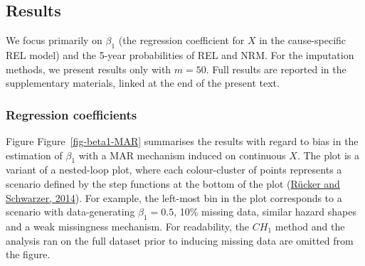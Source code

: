 \documentclass[
  letterpaper,
  DIV=11,
  numbers=noendperiod]{scrreprt}
\begin{document}
\hypertarget{results-1}{%
\subsection{Results}\label{results-1}}

We focus primarily on \(\beta_1\) (the regression coefficient for \(X\)
in the cause-specific REL model) and the 5-year probabilities of REL and
NRM. For the imputation methods, we present results only with
\(m = 50\). Full results are reported in the supplementary materials,
linked at the end of the present text.

\hypertarget{regression-coefficients-1}{%
\subsubsection{Regression
coefficients}\label{regression-coefficients-1}}

Figure Figure~\ref{fig-beta1-MAR} summarises the results with regard to
bias in the estimation of \(\beta_1\) with a MAR mechanism induced on
continuous \(X\). The plot is a variant of a nested-loop plot, where
each colour-cluster of points represents a scenario defined by the step
functions at the bottom of the plot
(\protect\hyperlink{ref-ruckerPresentingSimulationResults2014}{Rücker
and Schwarzer, 2014}). For example, the left-most bin in the plot
corresponds to a scenario with data-generating \(\beta_1 = 0.5\), 10\%
missing data, similar hazard shapes and a weak missingness mechanism.
For readability, the \(CH_{1}\) method and the analysis ran on the full
dataset prior to inducing missing data are omitted from the figure.
\end{document}
